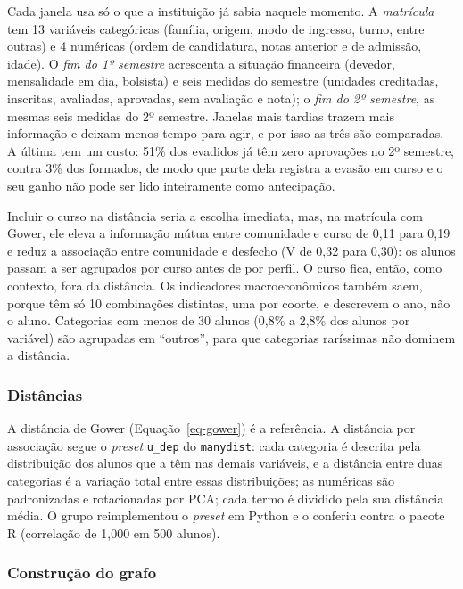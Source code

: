 Cada janela usa só o que a instituição já sabia naquele momento. A \textit{matrícula} tem 13 variáveis categóricas (família, origem, modo de ingresso, turno, entre outras) e 4 numéricas (ordem de candidatura, notas anterior e de admissão, idade). O \textit{fim do 1º semestre} acrescenta a situação financeira (devedor, mensalidade em dia, bolsista) e seis medidas do semestre (unidades creditadas, inscritas, avaliadas, aprovadas, sem avaliação e nota); o \textit{fim do 2º semestre}, as mesmas seis medidas do 2º semestre. Janelas mais tardias trazem mais informação e deixam menos tempo para agir, e por isso as três são comparadas. A última tem um custo: 51\% dos evadidos já têm zero aprovações no 2º semestre, contra 3\% dos formados, de modo que parte dela registra a evasão em curso e o seu ganho não pode ser lido inteiramente como antecipação.

Incluir o curso na distância seria a escolha imediata, mas, na matrícula com Gower, ele eleva a informação mútua entre comunidade e curso de 0,11 para 0,19 e reduz a associação entre comunidade e desfecho (V de 0,32 para 0,30): os alunos passam a ser agrupados por curso antes de por perfil. O curso fica, então, como contexto, fora da distância. Os indicadores macroeconômicos também saem, porque têm só 10 combinações distintas, uma por coorte, e descrevem o ano, não o aluno. Categorias com menos de 30 alunos (0,8\% a 2,8\% dos alunos por variável) são agrupadas em ``outros'', para que categorias raríssimas não dominem a distância.

\subsubsection{Distâncias}

A distância de Gower (Equação~\ref{eq-gower}) é a referência. A distância por associação segue o \textit{preset} \texttt{u\_dep} do \texttt{manydist}: cada categoria é descrita pela distribuição dos alunos que a têm nas demais variáveis, e a distância entre duas categorias é a variação total entre essas distribuições; as numéricas são padronizadas e rotacionadas por PCA; cada termo é dividido pela sua distância média. O grupo reimplementou o \textit{preset} em Python e o conferiu contra o pacote R (correlação de 1,000 em 500 alunos).

\subsubsection{Construção do grafo}

